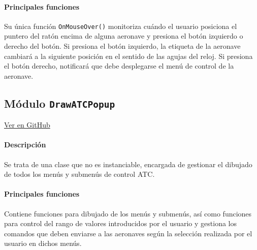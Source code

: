 \paragraph{Principales funciones} \phantom{\newline}

Su única función \texttt{OnMouseOver()} monitoriza cuándo el usuario posiciona el puntero del ratón encima de alguna aeronave y presiona el botón izquierdo o derecho del botón. Si presiona el botón izquierdo, la etiqueta de la aeronave cambiará a la siguiente posición en el sentido de las agujas del reloj. Si presiona el botón derecho, notificará que debe desplegarse el menú de control de la aeronave.





\clearpage

\subsection{Módulo \texttt{DrawATCPopup}}
\label{subsec:ClaseDrawATCPopup}

\vspace{-0.85cm}
\begin{flushright}
\href{https://github.com/macgyver912/atc-simulator/blob/jaime/Assets/Scripts/graphics/DrawATCPopup.cs}{Ver en GitHub \faGithub}
\end{flushright}

\paragraph{Descripción} \phantom{\newline}

Se trata de una clase que no es instanciable, encargada de gestionar el dibujado de todos los menús y submenús de control ATC.

\paragraph{Principales funciones} \phantom{\newline}

Contiene funciones para dibujado de los menús y submenús, así como funciones para control del rango de valores introducidos por el usuario y gestiona los comandos que deben enviarse a las aeronaves según la selección realizada por el usuario en dichos menús.








